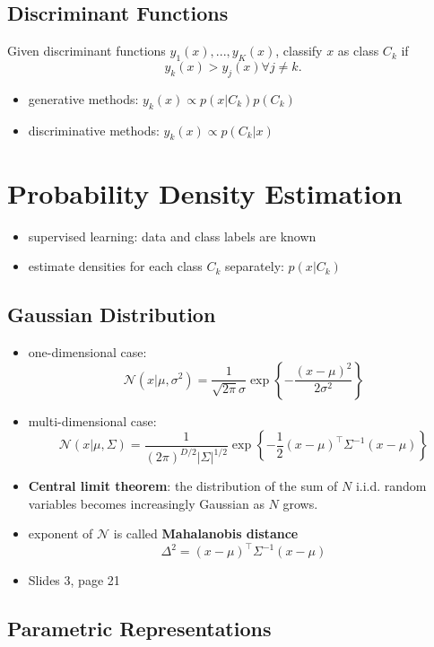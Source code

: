 \documentclass{article}
\renewcommand{\emph}[1]{\textbf{#1}}
\begin{document}
  \subsection{Discriminant Functions}

  Given discriminant functions $y_1(x), ..., y_K(x)$, classify $x$ as class $C_k$ if \[
    y_k(x) > y_j(x) \forall j \not = k.
  \]

  \begin{itemize}
    \item generative methods: $y_k(x) \propto p(x|C_k)p(C_k)$
    \item discriminative methods: $y_k(x) \propto p(C_k|x)$
  \end{itemize}

\section{Probability Density Estimation}

\begin{itemize}
  \item supervised learning: data and class labels are known
  \item estimate densities for each class $C_k$ separately: $p(x|C_k)$
\end{itemize}

\subsection{Gaussian Distribution}

\begin{itemize}
  \item one-dimensional case: \[
    \mathcal{N}(x|\mu, \sigma^2) = \frac{1}{\sqrt{2\pi}\sigma} \exp \left \{ - \frac{(x-\mu)^2}{2\sigma^2} \right \}
  \]
  \item multi-dimensional case: \[
    \mathcal{N}(x|\mu, \Sigma) = \frac{1}{(2\pi)^{D/2}|\Sigma|^{1/2}} \exp \left \{
      - \frac{1}{2} (x-\mu)^\top \Sigma^{-1}(x-\mu) \right \}
  \]
  \item \emph{Central limit theorem}: the distribution of the sum of $N$ i.i.d. random variables becomes increasingly Gaussian as $N$ grows.
  \item exponent of $\mathcal{N}$ is called \emph{Mahalanobis distance} \[
    \Delta^2 = (x-\mu)^\top \Sigma^{-1}(x-\mu)
  \]
  \item Slides 3, page 21
\end{itemize}

\subsection{Parametric Representations}
\end{document}
